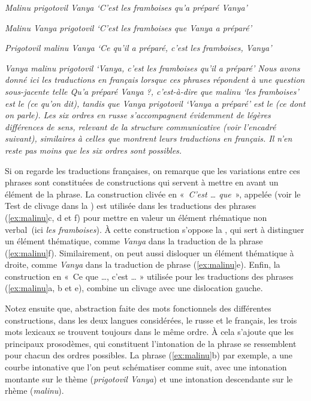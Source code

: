 {    \ex\itshape Malinu prigotovil Vanya
    \glt  ‘C’est les framboises qu’a préparé Vanya’

    \ex\itshape Malinu Vanya prigotovil
    \glt   ‘C’est les framboises que Vanya a préparé’

    \ex\itshape Prigotovil malinu Vanya
    \glt ‘Ce qu’il a préparé, c’est les framboises, Vanya’

    \ex\itshape Vanya malinu prigotovil
    \glt  ‘Vanya, c’est les framboises qu’il a préparé’
\z
\z
    Nous avons donné ici les traductions en français lorsque ces phrases répondent à une question sous-jacente telle \textit{Qu’a préparé Vanya} ?, c’est-à-dire que \textit{malinu} ‘les framboises’ est le  (ce qu’on dit), tandis que \textit{Vanya prigotovil} ‘Vanya a préparé’ est le  (ce dont on parle). Les six ordres en russe s’accompagnent évidemment de légères différences de sens, relevant de la structure communicative (voir l’encadré suivant), similaires à celles que montrent leurs traductions en français. Il n’en reste pas moins que les six ordres sont possibles.

    Si on regarde les traductions françaises, on remarque que les variations entre ces phrases sont constituées de constructions qui servent à mettre en avant un élément de la phrase. La construction clivée en «~\textit{C’est … que}~», appelée  (voir le Test de clivage dans la ) est utilisée dans les traductions des phrases (\ref{ex:malinu}c, d et f) pour mettre en valeur un élément rhématique non verbal~(ici \textit{les framboises}). À cette construction s’oppose la  , qui sert à distinguer un élément thématique, comme \textit{Vanya} dans la traduction de la phrase (\ref{ex:malinu}f). Similairement, on peut aussi disloquer un élément thématique à droite, comme \textit{Vanya} dans la traduction de phrase (\ref{ex:malinu}e). Enfin, la construction  en «~Ce que …, c’est … » utilisée pour les traductions des phrases (\ref{ex:malinu}a, b et e), combine un clivage avec une dislocation gauche.  
    
    
    Notez ensuite que, abstraction faite des mots fonctionnels des différentes constructions, dans les deux langues considérées, le russe et le français, les trois mots lexicaux se trouvent toujours dans le même ordre. À cela s’ajoute que les principaux prosodèmes, qui constituent l’intonation de la phrase se ressemblent pour chacun des ordres possibles. La phrase (\ref{ex:malinu}b) par exemple, a une courbe intonative que l’on peut schématiser comme suit, avec une intonation montante sur le thème (\textit{prigotovil Vanya}) et une intonation descendante sur le rhème (\textit{malinu}).

}
